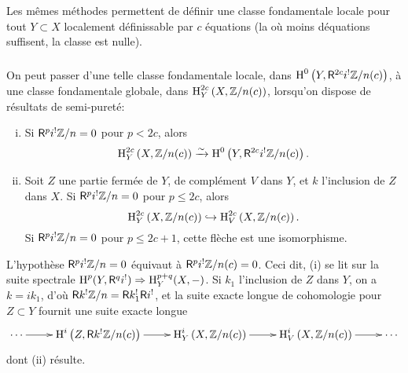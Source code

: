\subsubsection{}\label{IV:2-2-4}

Les m\^emes m\'ethodes permettent de d\'efinir une classe fondamentale locale 
pour tout $Y\subset X$ localement d\'efinissable par $c$ \'equations (la o\`u 
moins d\'equations suffisent, la classe est nulle). 





\subsubsection{}\label{IV:2-2-5}

On peut passer d'une telle classe fondamentale locale, dans 
$\operatorname{H}^0\left(Y,\mathsf{R}^{2 c} i^!\mathbb{Z}/n(c)\right)$, \`a une classe fondamentale globale, 
dans $\operatorname{H}_Y^{2 c}\left(X,\mathbb{Z}/n(c)\right)$, lorsqu'on dispose de r\'esultats de 
semi-puret\'e:





\begin{proposition}\label{IV:2-2-6}
\begin{enumerate}[(i)]
  \item Si $\mathsf{R}^p i^!\mathbb{Z}/n=0$ pour $p<2 c$, alors 
    \[
      \operatorname{H}_Y^{2 c}\left(X,\mathbb{Z}/n(c)\right) \xrightarrow\sim \operatorname{H}^0\left(Y,\mathsf{R}^{2 c} i^! \mathbb{Z}/n(c)\right) \text{.}
    \]
  \item Soit $Z$ une partie ferm\'ee de $Y$, de compl\'ement $V$ dans $Y$, et 
    $k$ l'inclusion de $Z$ dans $X$. Si $\mathsf{R}^p i^! \mathbb{Z}/n = 0$ pour 
    $p\leqslant 2 c$, alors 
    \[
      \operatorname{H}_Y^{2 c}\left(X,\mathbb{Z}/n(c)\right) \hookrightarrow \operatorname{H}_V^{2 c}\left(X,\mathbb{Z}/n(c)\right) \text{.}
    \]
    Si $\mathsf{R}^p i^!\mathbb{Z}/n=0$ pour $p\leqslant 2 c+1$, cette fl\`eche est une 
    isomorphisme.
\end{enumerate}
\end{proposition}

L'hypoth\`ese $\mathsf{R}^p i^!\mathbb{Z}/n=0$ \'equivaut \`a $\mathsf{R}^p i^!\mathbb{Z}/n(c)=0$. Ceci dit, 
(i) se lit sur la suite spectrale 
$\operatorname{H}^p(Y,\mathsf{R}^q i^!)\Rightarrow \operatorname{H}_Y^{p+q}(X,-)$. Si $k_1$ l'inclusion de $Z$ dans 
$Y$, on a $k=i k_1$, d'o\`u $\mathsf{R} k^! \mathbb{Z}/n=\mathsf{R} k_1^! \mathsf{R} i^!$, et la suite exacte 
longue de cohomologie pour $Z\subset Y$ fournit une suite exacte longue 
\[\xymatrix{
  \cdots \ar[r] 
    & \h^i\left(Z,\R k^! \dZ/n(c)\right) \ar[r] 
    & \h_Y^i\left(X,\dZ/n(c)\right) \ar[r] 
    & \h_V^i\left(X,\dZ/n(c)\right) \ar[r] 
    & \cdots
}\]
dont (ii) r\'esulte. 





